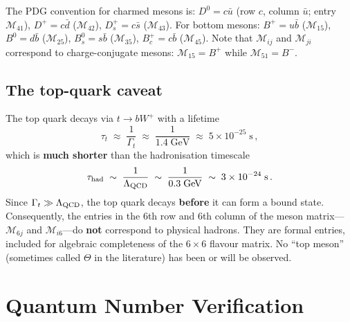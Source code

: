 \documentclass[11pt,a4paper]{article}
\begin{document}
\begin{remark}
The PDG convention for charmed mesons is:
$D^0 = c\bar{u}$ (row $c$, column $\bar{u}$; entry $\mathcal{M}_{41}$),
$D^+ = c\bar{d}$ ($\mathcal{M}_{42}$),
$D_s^+ = c\bar{s}$ ($\mathcal{M}_{43}$).
For bottom mesons:
$B^+ = u\bar{b}$ ($\mathcal{M}_{15}$),
$B^0 = d\bar{b}$ ($\mathcal{M}_{25}$),
$B_s^0 = s\bar{b}$ ($\mathcal{M}_{35}$),
$B_c^+ = c\bar{b}$ ($\mathcal{M}_{45}$).
Note that $\mathcal{M}_{ij}$ and $\mathcal{M}_{ji}$ correspond to
charge-conjugate mesons: $\mathcal{M}_{15} = B^+$ while
$\mathcal{M}_{51} = B^-$.
\end{remark}


\subsection{The top-quark caveat}
\label{sec:top-caveat}

\begin{warningbox}[title={Top-quark mesons are formal entries only}]
The top quark decays via $t \to bW^+$ with a lifetime
\begin{equation}\label{eq:top-lifetime}
  \tau_t \;\approx\; \frac{1}{\Gamma_t}
  \;\approx\; \frac{1}{1.4\;\text{GeV}}
  \;\approx\; 5 \times 10^{-25}\;\text{s}\,,
\end{equation}
which is \textbf{much shorter} than the hadronisation timescale
\begin{equation}\label{eq:hadronisation-time}
  \tau_{\text{had}} \;\sim\; \frac{1}{\Lambda_{\mathrm{QCD}}}
  \;\sim\; \frac{1}{0.3\;\text{GeV}}
  \;\sim\; 3 \times 10^{-24}\;\text{s}\,.
\end{equation}
Since $\Gamma_t \gg \Lambda_{\mathrm{QCD}}$, the top quark decays
\textbf{before} it can form a bound state.  Consequently, the entries
in the 6th row and 6th column of the meson matrix---$\mathcal{M}_{6j}$
and $\mathcal{M}_{i6}$---do \textbf{not} correspond to physical hadrons.
They are formal entries, included for algebraic completeness of the
$6 \times 6$ flavour matrix.  No ``top meson'' (sometimes called
$\Theta$ in the literature) has been or will be observed.
\end{warningbox}


\section{Quantum Number Verification}
\label{sec:qn-verification}
\end{document}
